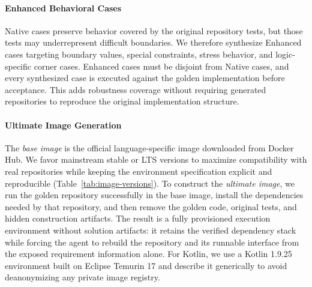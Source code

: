 \paragraph{Enhanced Behavioral Cases}
Native cases preserve behavior covered by the original repository tests, but those tests may underrepresent difficult boundaries. We therefore synthesize Enhanced cases targeting boundary values, special constraints, stress behavior, and logic-specific corner cases. Enhanced cases must be disjoint from Native cases, and every synthesized case is executed against the golden implementation before acceptance. This adds robustness coverage without requiring generated repositories to reproduce the original implementation structure.

\paragraph{Ultimate Image Generation}
\label{sec:ultimate-image-generation}
The \emph{base image} is the official language-specific image downloaded from Docker Hub. We favor mainstream stable or LTS versions to maximize compatibility with real repositories while keeping the environment specification explicit and reproducible (Table~\ref{tab:image-versions}). To construct the \emph{ultimate image}, we run the golden repository successfully in the base image, install the dependencies needed by that repository, and then remove the golden code, original tests, and hidden construction artifacts. The result is a fully provisioned execution environment without solution artifacts: it retains the verified dependency stack while forcing the agent to rebuild the repository and its runnable interface from the exposed requirement information alone. For Kotlin, we use a Kotlin 1.9.25 environment built on Eclipse Temurin 17 and describe it generically to avoid deanonymizing any private image registry.

